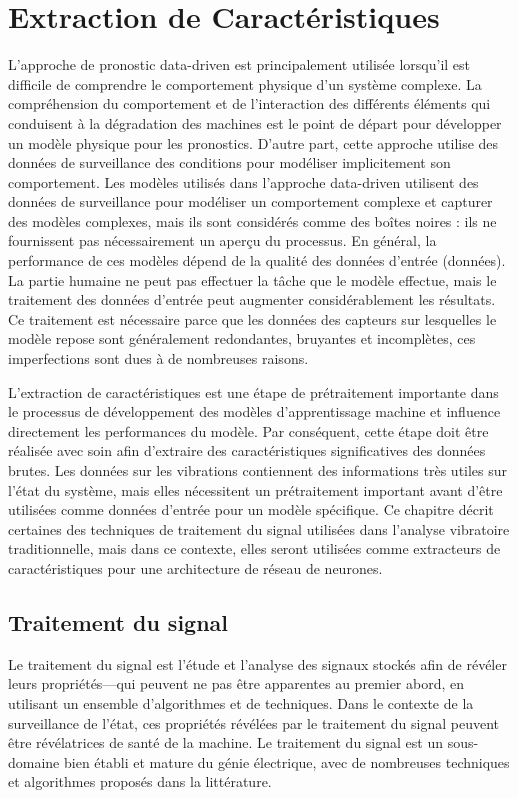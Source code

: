 \section{Extraction de Caractéristiques}
L'approche de pronostic data-driven est principalement utilisée lorsqu'il est difficile de comprendre le comportement physique d'un système complexe. La compréhension du comportement et de l'interaction des différents éléments qui conduisent à la dégradation des machines est le point de départ pour développer un modèle physique pour les pronostics.
D'autre part, cette approche utilise des données de surveillance des conditions pour modéliser implicitement son comportement. Les modèles utilisés dans l'approche data-driven utilisent des données de surveillance pour modéliser un comportement complexe et capturer des modèles complexes, mais ils sont considérés comme des boîtes noires : ils ne fournissent pas nécessairement un aperçu du processus.
En général, la performance de ces modèles dépend de la qualité des données d'entrée (données). La partie humaine ne peut pas effectuer la tâche que le modèle effectue, mais le traitement des données d'entrée peut augmenter considérablement les résultats. Ce traitement est nécessaire parce que les données des capteurs sur lesquelles le modèle repose sont généralement redondantes, bruyantes et incomplètes, ces imperfections sont dues à de nombreuses raisons.

L'extraction de caractéristiques est une étape de prétraitement importante dans le processus de développement des modèles d'apprentissage machine et influence directement les performances du modèle. Par conséquent, cette étape doit être réalisée avec soin afin d'extraire des caractéristiques significatives des données brutes. Les données sur les vibrations contiennent des informations très utiles sur l'état du système, mais elles nécessitent un prétraitement important avant d'être utilisées comme données d'entrée pour un modèle spécifique. Ce chapitre décrit certaines des techniques de traitement du signal utilisées dans l'analyse vibratoire traditionnelle, mais dans ce contexte, elles seront utilisées comme extracteurs de caractéristiques pour une architecture de réseau de neurones.

\subsection{Traitement du signal}
Le traitement du signal est l'étude et l'analyse des signaux stockés afin de révéler leurs propriétés—qui peuvent ne pas être apparentes au premier abord, en utilisant un ensemble d'algorithmes et de techniques. Dans le contexte de la surveillance de l'état, ces propriétés révélées par le traitement du signal peuvent être révélatrices de santé de la machine.
Le traitement du signal est un sous-domaine bien établi et mature du génie électrique, avec de nombreuses techniques et algorithmes proposés dans la littérature.

